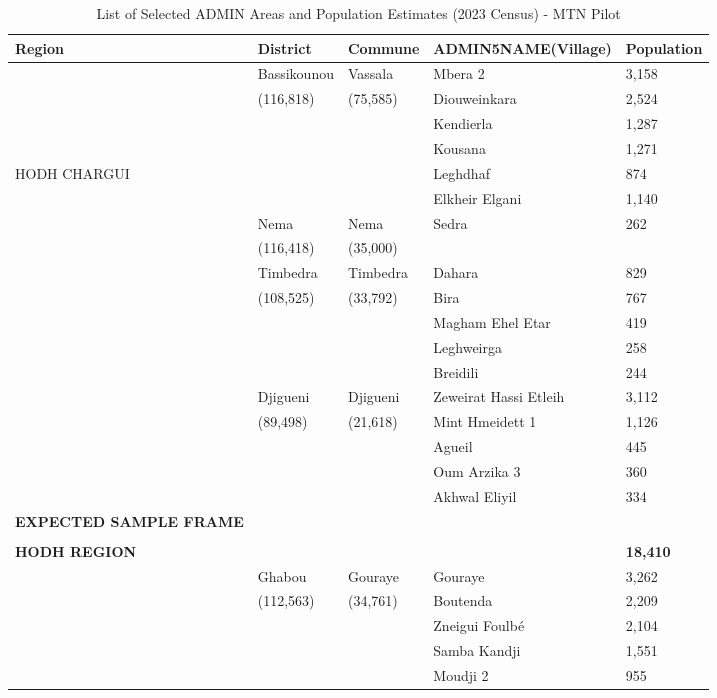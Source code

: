 \begin{table}[!ht]
	\caption{List of Selected ADMIN Areas and Population Estimates (2023 Census) - MTN Pilot}
	\centering
	\begin{adjustbox}{max width=\textwidth}
	\begin{tabular}{lllll}
		\hline 
		\scriptsize
		\textbf{Region} & \textbf{District} & \textbf{Commune} & \textbf{ADMIN5NAME(Village)} & \textbf{Population} \\ \hline\hline
		~ & Bassikounou & Vassala & Mbera 2 &  3,158  \\ 
		~ & (116,818) & (75,585) & Diouweinkara &  2,524  \\ 
		~ & ~ & ~ & Kendierla &  1,287  \\ 
		~ & ~ & ~ & Kousana &  1,271  \\ 
		HODH CHARGUI & ~ & ~ & Leghdhaf &  874  \\ 
		~ & ~ & ~ & Elkheir Elgani &  1,140  \\ 
		~ & Nema & Nema & Sedra &  262  \\ 
		~ & (116,418) & (35,000) & ~ & ~ \\ 
		~ & Timbedra & Timbedra & Dahara &  829  \\ 
		~ & (108,525) & (33,792) & Bira &  767  \\ 
		~ & ~ & ~ & Magham Ehel Etar &  419  \\ 
		~ & ~ & ~ & Leghweirga &  258  \\ 
		~ & ~ & ~ & Breidili &  244  \\ 
		~ & Djigueni & Djigueni & Zeweirat Hassi Etleih &  3,112  \\
		~ & (89,498) & (21,618) & Mint Hmeidett 1 &  1,126  \\ 
		~ & ~ & ~ & Agueil &  445  \\
		~ & ~ & ~ & Oum Arzika 3 &  360  \\ 
		~ & ~ & ~ & Akhwal Eliyil &  334  \\ \hline
		\textbf{EXPECTED SAMPLE FRAME} \\ \\ \textbf{HODH REGION} & ~ & ~ & ~ &  \textbf{18,410}  \\ \hline \hline
		~ & Ghabou & Gouraye & Gouraye &  3,262  \\ 
		~ & (112,563) & (34,761) & Boutenda &  2,209  \\ 
		~ & ~ & ~ & Zneigui Foulbé &  2,104  \\ 
		~ & ~ & ~ & Samba Kandji &  1,551  \\ 
		~ & ~ & ~ & Moudji 2 &  955  \\ 

\end{tabular}
\end{adjustbox}
\end{table}
